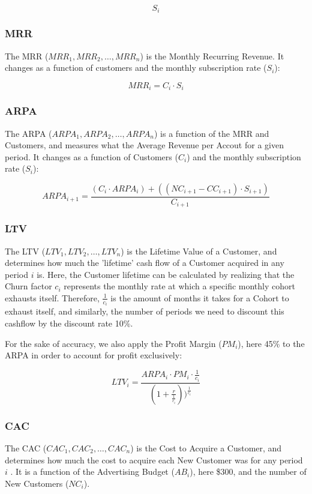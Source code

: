 \documentclass[11pt]{article}
\begin{document}
\[
S_{i}
\]

\subsubsection*{MRR}

The MRR ($MRR_{1}, MRR_{2}, \ldots, MRR_{n}$) is the Monthly Recurring Revenue. It changes as a function of customers and the monthly subscription rate ($S_{i}$):

\[
MRR_{i} = C_{i} \cdot S_{i}
\]

\subsubsection*{ARPA}

The ARPA ($ARPA_{1}, ARPA_{2}, \ldots, ARPA_{n}$) is a function of the MRR and Customers, and measures what the Average Revenue per Accout for a given period. It changes as a function of Customers ($C_{i}$) and the monthly subscription rate ($S_{i}$):

\[
ARPA_{i+1} = \frac{(C_{i} \cdot ARPA_{i}) + ((NC_{i+1} - CC_{i+1}) \cdot S_{i+1})}{C_{i+1}}
\]


\subsubsection*{LTV}

The LTV ($LTV_{1}, LTV_{2}, \ldots, LTV_{n}$) is the Lifetime Value of a Customer, and determines how much the 'lifetime' cash flow of a Customer acquired in any period $i$  is. Here, the Customer lifetime can be calculated by realizing that the Churn factor $c_{i}$ represents the monthly rate at which a specific monthly cohort exhausts itself. Therefore, $\frac{1}{c_{i}}$ is the amount of months it takes for a Cohort to exhaust itself, and similarly, the number of periods we need to discount this cashflow by the discount rate 10\%. 

For the sake of accuracy, we also apply the Profit Margin ($PM_{i}$), here 45\% to the ARPA in order to account for profit exclusively:

\[
LTV_{i} = \frac{ARPA_{i} \cdot PM_{i} \cdot \frac{1}{c_{i}}}{(1 + \frac{r}{\frac{1}{c_{i}}}))^\frac{1}{c_{i}}}
\]


\subsubsection*{CAC}

The CAC ($CAC_{1}, CAC_{2}, \ldots, CAC_{n}$) is the Cost to Acquire a Customer, and determines how much the cost to acquire each New Customer was for any period $i$  . It is a function of the Advertising Budget ($AB_{i}$), here \$300, and the number of New Customers ($NC_{i}$). 
\end{document}
